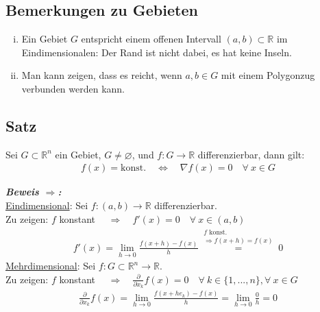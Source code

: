 \documentclass[11pt,a4paper]{book}
\newcommand {\R}	{\mathbb{R}}
\newcommand {\Rn}	{\mathbb{R}^n}
\newcommand{\1}    	{\mathbbm{1}}
\newcommand{\Beweis}[1][Beweis]
{\begin{mdframed}[backgroundcolor=gray!10,linewidth=0pt]\noindent\textit{\textbf{{#1}:}}~}
\newcommand{\QED}	{\end{mdframed}}
\begin{document}
\subsection{Bemerkungen zu Gebieten}

\begin{enumerate}[(i)]
	\item Ein Gebiet \(G\) entspricht einem offenen Intervall \( (a,b) \subset \R\) im Eindimensionalen: Der Rand ist nicht dabei, es hat keine Inseln.
	\item Man kann zeigen, dass es reicht, wenn \(a,b \in G\) mit einem Polygonzug verbunden werden kann.
\end{enumerate}
	
\subsection{Satz}

Sei \(G \subset \Rn\) ein Gebiet, \(G \neq \varnothing\), und \(f : G \rightarrow \R\) differenzierbar, dann gilt:
\begin{align*}
	f(x) = \textrm{konst.} \quad\Leftrightarrow\quad \nabla f(x) = 0 \quad \forall~ x \in G
\end{align*}

\Beweis[Beweis \(\Rightarrow\)]\\
\underline{Eindimensional}: Sei \(f:(a,b) \rightarrow \R\) differenzierbar.\\
Zu zeigen: \(f\) konstant \(\quad\Rightarrow\quad f'(x) = 0 \quad \forall~ x \in (a,b)\)
\begin{align*}
	f'(x) = \lim_{h \rightarrow 0} \frac{f(x+h) - f(x)}{h}
	\stackrel{\substack{
		f \textrm{ konst.}\\
		\Rightarrow f(x+h) = f(x)
	}}{=} 0
\end{align*}
\underline{Mehrdimensional}: Sei \(f: G \subset \Rn \rightarrow \R\).\\
Zu zeigen: \(f\) konstant \(\quad\Rightarrow\quad\frac{\partial}{\partial x_k} f(x) = 0 \quad \forall~ k \in \{1, ..., n\}, \forall~ x \in G\)
\begin{align*}
	\frac{\partial}{\partial x_k} f(x) = 
	\lim_{h \rightarrow 0} \frac{f(x+h e_k) - f(x)}{h} =
	\lim_{h \rightarrow 0} \frac{0}{h} = 0
\end{align*}
\QED
\end{document}
